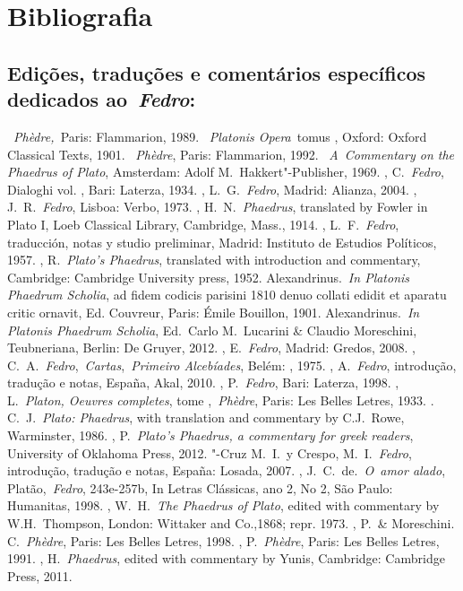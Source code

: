\chapter{Bibliografia}

\section{Edições, traduções e comentários específicos dedicados
ao~\emph{Fedro}:}

 

\begin{bibliohedra}
~\emph{Phèdre,~}Paris: Flammarion, 1989.
~\emph{Platonis Opera}~tomus , Oxford: Oxford Classical
  Texts, 1901.
~\emph{Phèdre}, Paris: Flammarion, 1992.
~\emph{A~Commentary on the Phaedrus of Plato},
  Amsterdam: Adolf M.~Hakkert"-Publisher, 1969.
, C.~\emph{Fedro}, Dialoghi vol. , Bari: Laterza, 1934.
, L.~G.~\emph{Fedro}, Madrid: Alianza, 2004.
, J.~R.~\emph{Fedro}, Lisboa: Verbo, 1973.
, H.~N.~\emph{Phaedrus}, translated by Fowler in Plato I, Loeb
  Classical Library, Cambridge, Mass., 1914.
, L.~F.~\emph{Fedro}, traducción, notas y studio preliminar,
  Madrid: Instituto de Estudios Políticos, 1957.
, R.~\emph{Plato's Phaedrus}, translated with introduction
  and commentary, Cambridge: Cambridge University press, 1952.
 Alexandrinus.~\emph{In Platonis Phaedrum Scholia}, ad fidem
  codicis parisini 1810 denuo collati edidit et aparatu critic ornavit,
  Ed. Couvreur, Paris: Émile Bouillon, 1901.
 Alexandrinus.~\emph{In Platonis Phaedrum Scholia}, Ed.~Carlo
  M.~Lucarini \& Claudio Moreschini, Teubneriana, Berlin: De Gruyer,
  2012.
, E.~\emph{Fedro}, Madrid: Gredos, 2008.
, C.~A.~\emph{Fedro},~\emph{Cartas},~\emph{Primeiro Alcebíades},
  Belém: , 1975.
, A.~\emph{Fedro}, introdução, tradução e notas, España, Akal,
  2010.
, P.~\emph{Fedro}, Bari: Laterza, 1998.
, L.~\emph{Platon, Oeuvres completes}, tome ,~\emph{Phèdre},
  Paris: Les Belles Letres, 1933.
. C.~J.~\emph{Plato: Phaedrus}, with translation and commentary by
  C.J.~Rowe, Warminster, 1986.
, P.~\emph{Plato's Phaedrus, a commentary for greek readers},
  University of Oklahoma Press, 2012.
"-Cruz M.~I.~y Crespo, M.~I.~\emph{Fedro}, introdução, tradução e
  notas, España: Losada, 2007.
, J.~C.~de.~\emph{O~amor alado}, Platão,~\emph{Fedro}, 243e-257b,
  In Letras Clássicas, ano 2, No 2, São Paulo: Humanitas, 1998.
, W.~H.~\emph{The Phaedrus of Plato}, edited with commentary
  by W.H.~Thompson, London: Wittaker and Co.,1868; repr. 1973.
, P.~\& Moreschini. C.~\emph{Phèdre}, Paris: Les Belles Letres,
  1998.
, P.~\emph{Phèdre}, Paris: Les Belles Letres, 1991.
, H.~\emph{Phaedrus}, edited with commentary by Yunis, Cambridge:
  Cambridge Press, 2011.
\end{bibliohedra}

